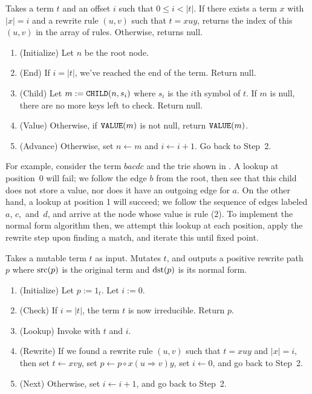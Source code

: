 \documentclass[../generics]{subfiles}
\begin{document}
\begin{algorithm}\label{trie lookup algo}
Takes a term $t$ and an offset $i$ such that $0\leq i<|t|$. If there exists a term $x$ with $|x|=i$ and a rewrite rule $(u,v)$ such that $t=xuy$, returns the index of this $(u,v)$ in the array of rules. Otherwise, returns null.
\begin{enumerate}
\item (Initialize) Let $n$ be the root node.
\item (End) If $i=|t|$, we've reached the end of the term. Return null.
\item (Child) Let $m := \texttt{CHILD}(n,s_i)$ where $s_i$ is the $i$th symbol of $t$. If $m$ is null, there are no more keys left to check. Return null.
\item (Value) Otherwise, if $\texttt{VALUE}(m)$ is not null, return $\texttt{VALUE}(m)$.
\item (Advance) Otherwise, set $n \leftarrow m$ and $i \leftarrow i+1$. Go back to Step~2.
\end{enumerate}
\end{algorithm}

For example, consider the term $bacdc$ and the trie shown in . A lookup at position~0 will fail; we follow the edge $b$ from the root, then see that this child does not store a value, nor does it have an outgoing edge for $a$. On the other hand, a lookup at position 1 will succeed; we follow the sequence of edges labeled $a$, $c$,~and~$d$, and arrive at the node whose value is rule (2). To implement the normal form algorithm then, we attempt this lookup at each position, apply the rewrite step upon finding a match, and iterate this until fixed point.

\begin{algorithm}\label{term reduction trie algo}
Takes a mutable term $t$ as input. Mutates $t$, and outputs a positive rewrite path~$p$ where $\operatorname{src}(p)$ is the original term and $\operatorname{dst}(p)$ is its normal form.
\begin{enumerate}
\item (Initialize) Let $p := 1_t$. Let $i := 0$.
\item (Check) If $i=|t|$, the term $t$ is now irreducible. Return $p$.
\item (Lookup) Invoke  with $t$ and $i$.
\item (Rewrite) If we found a rewrite rule $(u, v)$ such that $t=xuy$ and $|x|=i$, then set $t\leftarrow xvy$, set $p\leftarrow p\circ x(u\Rightarrow v)y$, set $i\leftarrow 0$, and go back to Step~2.
\item (Next) Otherwise, set $i\leftarrow i+1$, and go back to Step~2.
\end{enumerate}
\end{algorithm}
\end{document}
